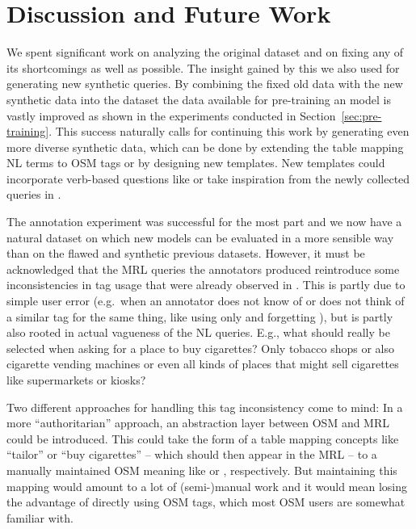 \chapter{Discussion and Future Work}
\label{ch:discussion}

We spent significant work on analyzing the original \nlmapstwo{} dataset and on
fixing any of its shortcomings as well as possible. The insight gained by this
we also used for generating new synthetic queries. By combining the fixed old
data with the new synthetic data into the \nlmapsthree{} dataset the data
available for pre-training an \nlmaps{} model is vastly improved as shown in the
experiments conducted in Section~\ref{sec:pre-training}. This success naturally
calls for continuing this work by generating even more diverse synthetic data,
which can be done by extending the table mapping NL terms to OSM tags or by
designing new templates. New templates could incorporate verb-based questions
like  or take inspiration from the newly
collected queries in \nlmapsfour{}.

The annotation experiment was successful for the most part and we now have a
natural dataset on which new \nlmaps{} models can be evaluated in a more
sensible way than on the flawed and synthetic previous datasets. However, it
must be acknowledged that the MRL queries the annotators produced reintroduce
some inconsistencies in tag usage that were already observed in \nlmapstwo{}.
This is partly due to simple user error (e.g.\ when an annotator does not know
of or does not think of a similar tag for the same thing, like using only
 and forgetting ), but is partly also
rooted in actual vagueness of the NL queries. E.g., what should really be
selected when asking for a place to buy cigarettes? Only tobacco shops or also
cigarette vending machines or even all kinds of places that might sell
cigarettes like supermarkets or kiosks?

Two different approaches for handling this tag inconsistency come to mind: In a
more \enquote{authoritarian} approach, an abstraction layer between OSM and MRL
could be introduced. This could take the form of a table mapping concepts like
\enquote{tailor} or \enquote{buy cigarettes} – which should then appear in the
MRL – to a manually maintained OSM meaning like 
 or  ,
respectively. But maintaining this mapping would amount to a lot of
(semi-)manual work and it would mean losing the advantage of directly using OSM
tags, which most OSM users are somewhat familiar with.


